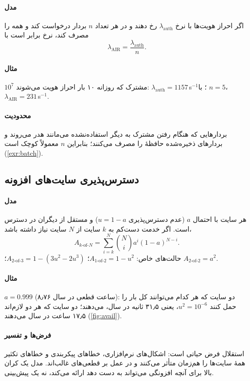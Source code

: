 \documentclass[11pt,a4paper]{article}
\begin{document}
\paragraph{مدل} اگر احراز هویت‌ها با نرخ $\lambda_{\mathrm{auth}}$ رخ دهند و  در هر  تعداد $n$ بردار
درخواست کند و همه را مصرف کند، نرخ  برابر است با
\begin{equation}\label{eq:air}
  \lambda_{\mathrm{AIR}} = \frac{\lambda_{\mathrm{auth}}}{n}.
\end{equation}
\paragraph{مثال} $10^7$ مشترک که روزانه ۱۰ بار احراز هویت می‌شوند: $\lambda_{\mathrm{auth}} = 1157$\,s$^{-1}$؛ با $n = 5$،
$\lambda_{\mathrm{AIR}} = 231$\,s$^{-1}$. \paragraph{محدودیت} بردارهایی که هنگام رفتن مشترک به  دیگر استفاده‌نشده
می‌مانند هدر می‌روند و بردارهای ذخیره‌شده حافظهٔ  را مصرف می‌کنند؛ بنابراین $n$ معمولاً کوچک است
(\cref{exr:batch}).

\subsection{دسترس‌پذیری سایت‌های افزونه}\label{sec:avail}
\paragraph{مدل} هر سایت با احتمال $a$ (عدم دسترس‌پذیری $u = 1-a$) و مستقل از دیگران در دسترس است. اگر خدمت دست‌کم
به $k$ سایت از $N$ سایت نیاز داشته باشد،
\begin{equation}\label{eq:avail}
  A_{k\text{-of-}N} = \sum_{i=k}^{N}\binom{N}{i}a^{i}(1-a)^{N-i}.
\end{equation}
حالت‌های خاص: $A_{1\text{-of-}2} = 1-u^2$؛ $A_{2\text{-of-}3} = 1-(3u^2-2u^3)$؛ $A_{2\text{-of-}2} = a^2$.
\paragraph{مثال} $a = 0.999$ (۸٫۷۶ ساعت قطعی در سال): دو سایت که هر کدام می‌توانند کل بار را حمل کنند $u^2 = 10^{-6}$،
یعنی ۳۱٫۵ ثانیه در سال، می‌دهند؛ دو سایت که هر دو لازم‌اند ۱۷٫۵ ساعت در سال می‌دهند (\cref{fig:avail}).
\paragraph{فرض‌ها و تفسیر} استقلال فرض حیاتی است: اشکال‌های نرم‌افزاری، خطاهای پیکربندی و خطاهای تکثیر همهٔ سایت‌ها را
هم‌زمان متأثر می‌کنند و در عمل بر قطعی‌های  غالب‌اند. مدل یک کران بالا برای آنچه افزونگی می‌تواند به دست
دهد ارائه می‌کند، نه یک پیش‌بینی.
\end{document}
